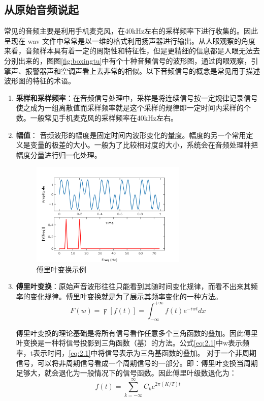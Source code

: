 \subsection{从原始音频说起}
常见的音频主要是利用手机麦克风，在40kHz左右的采样频率下进行收集的。因此呈现在 wav 文件中常常是以一维的格式利用扬声器进行输出。从人眼观察的角度来看，音频样本具有着一定的周期性和特征性，但是更精细的信息都是人眼无法去分别出来的，图图\ref{fig:boxingtu}中有个十种音频信号的波形图，通过肉眼观察，引擎声、报警器声和空调声看上去非常的相似。以下音频信号的概念是常见用于描述波形图的特征的术语。
\begin{enumerate}
  \item \textbf{采样和采样频率}：在音频信号处理中，采样是将连续信号按一定规律记录信号使之成为一组离散值而采样频率就是这个采样的规律即一定时间内采样的个数。一般常见手机麦克风的采样频率在40kHz左右。 
  \item \textbf{幅值}： 音频波形的幅度是固定时间内波形变化的量度。幅度的另一个常用定义是变量的极差的大小。一般为了比较相对度的大小，系统会在音频处理种把幅度分量进行归一化处理。
      \begin{figure}[h]
      \centering
      \includegraphics[width=0.7\textwidth]{figures/傅里叶变换图片.png}
      \caption{傅里叶变换示例}
      \label{fig:fuliye}
    \end{figure}
  \item \textbf{傅里叶变换}：原始声音波形往往只能看到其随时间变化规律，而看不出来其频率的变化规律。傅里叶变换就是为了展示其频率变化的一种方法。
        \begin{equation}
         F(w) = \digamma[f(t)] = \int_{-\infty}^{ +\infty} f(t)e^{-iwt} dx
         \label{eq:2.1}
        \end{equation}
        
    傅里叶变换的理论基础是将所有信号看作任意多个三角函数的叠加。因此傅里叶变换是一种将信号投影到三角函数（基）的方法。公式\eqref{eq:2.1}中w表示频率，t表示时间，\eqref{eq:2.1}中将信号表示为三角基函数的叠加。
    对于一个非周期信号，可以将非周期信号看成一个周期信号的一部分。即：傅里叶变换当周期足够大，就会退化为一般情况下的信号函数。因此傅里叶级数退化为：
    \begin{equation}
        f(t) = \sum_{k=-\infty}^{\infty} C_k e^{2\pi(K/T)t}
    \end{equation}
    

\end{enumerate}
